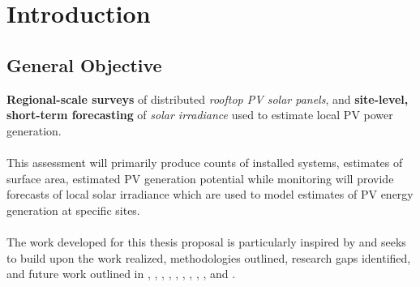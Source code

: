 \section{Introduction}



\subsection{General Objective}
    \vspace{0.5cm}
    
    \textbf{Regional-scale surveys} of distributed \textit{rooftop PV solar panels}, and \textbf{site-level, short-term forecasting} of \textit{solar irradiance} used to estimate local PV power generation. \\
    \\
    This assessment will primarily produce counts of installed systems, estimates of surface area, estimated PV generation potential while monitoring will provide forecasts of local solar irradiance which are used to model estimates of PV energy generation at specific sites. \\
    \\ 
    The work developed for this thesis proposal is particularly inspired by and seeks to build upon the work realized, methodologies outlined, research gaps identified, and future work outlined in \cite{robinson_ms_planet_global_renewables_watch_2025}, \cite{Boussif_neurips_day_ahead_solar_forecasting_2023}, \cite{Li_solarcube_solar_forecasting_2024}, \cite{maxar_germany_pv_dataset}, \cite{Hu_solar_array_pitfalls_2022}, \cite{de-Hoog_sota_survey_2020}, \cite{Bansal_ssl_nowcasting_2022}, \cite{Jiang_rooftop_pv_assessment_2022}, \cite{Tremenbert_Kasmi_pyPV_roof_2023}, and \cite{Yu_deep_solar_2018}.

